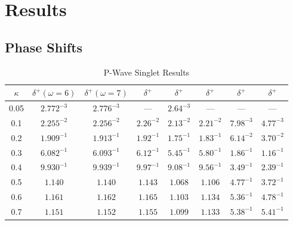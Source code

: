 \documentclass[Dissertation.tex]{subfiles}
\begin{document}
\section{Results}

\subsection{Phase Shifts}

\begin{table}[H]
\centering
\begin{tabular}{c | c c c c c c c}
\toprule
$\kappa$ & $\delta^+ (\omega = 6)$ & $\delta^+ (\omega = 7)$ & $\delta^+$ \cite{VanReethPrivate} & $\delta^+$ \cite{Blackwood2002} & $\delta^+$ \cite{Walters2004} & $\delta^+$ \cite{Ray1997} & $\delta^+$ \cite{Adhikari1999} \\
\midrule
0.05 & $2.772^{-3}$ & $2.776^{-3}$ & --- & $2.64^{-3}$ & --- & --- & --- \\
0.1 & $2.255^{-2}$ & $2.256^{-2}$ & $2.26^{-2}$ & $2.13^{-2}$ & $2.21^{-2}$ & $7.98^{-3}$ & $4.77^{-3}$ \\
0.2 & $1.909^{-1}$ & $1.913^{-1}$ & $1.92^{-1}$ & $1.75^{-1}$ & $1.83^{-1}$ & $6.14^{-2}$ & $3.70^{-2}$ \\
0.3 & $6.082^{-1}$ & $6.093^{-1}$ & $6.12^{-1}$ & $5.45^{-1}$ & $5.80^{-1}$ & $1.86^{-1}$ & $1.16^{-1}$ \\
0.4 & $9.930^{-1}$ & $9.939^{-1}$ & $9.97^{-1}$ & $9.08^{-1}$ & $9.56^{-1}$ & $3.49^{-1}$ & $2.39^{-1}$ \\
0.5 & $1.140$ & $1.140$ & $1.143$ & $1.068$ & $1.106$ & $4.77^{-1}$ & $3.72^{-1}$ \\
0.6 & $1.161$ & $1.162$ & $1.165$ & $1.103$ & $1.134$ & $5.36^{-1}$ & $4.78^{-1}$ \\
0.7 & $1.151$ & $1.152$ & $1.155$ & $1.099$ & $1.133$ & $5.38^{-1}$ & $5.41^{-1}$ \\
\bottomrule
\end{tabular}
\caption{P-Wave Singlet Results}
\label{tab:PWaveSinglet}
\end{table}
\end{document}
